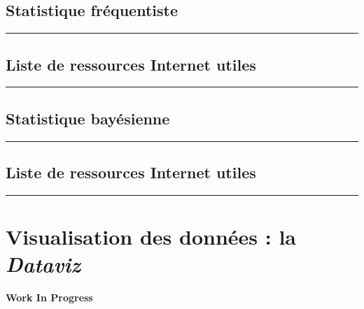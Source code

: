 \documentclass[
  french,
]{book}
\newenvironment{infobox}[1]
  {
  \begin{itemize}
  \renewcommand{\labelitemi}{
    \raisebox{-.7\height}[0pt][0pt]{
      {\setkeys{Gin}{width=3em,keepaspectratio}
        \texttt{[image: images/\#1]}}
    }
  }
  \setlength{\fboxsep}{1em}
  \begin{blackbox}
  \item
  }
  {
  \end{blackbox}
  \end{itemize}
  }
\begin{document}
\hypertarget{frequentiste}{%
\section{Statistique fréquentiste}\label{frequentiste}}

\begin{center}\rule{0.5\linewidth}{0.5pt}\end{center}

\hypertarget{ref-stat-freq}{%
\section*{Liste de ressources Internet utiles}\label{ref-stat-freq}}

\begin{center}\rule{0.5\linewidth}{0.5pt}\end{center}

\hypertarget{bayesienne}{%
\section{Statistique bayésienne}\label{bayesienne}}

\begin{center}\rule{0.5\linewidth}{0.5pt}\end{center}

\hypertarget{ref-stat-bayes}{%
\section*{Liste de ressources Internet utiles}\label{ref-stat-bayes}}

\begin{center}\rule{0.5\linewidth}{0.5pt}\end{center}

\hypertarget{dataviz}{%
\chapter{\texorpdfstring{Visualisation des données : la \emph{Dataviz}}{Visualisation des données : la Dataviz}}\label{dataviz}}

\begin{infobox}{caution}

\textbf{Work In Progress}

\end{infobox}
\end{document}

